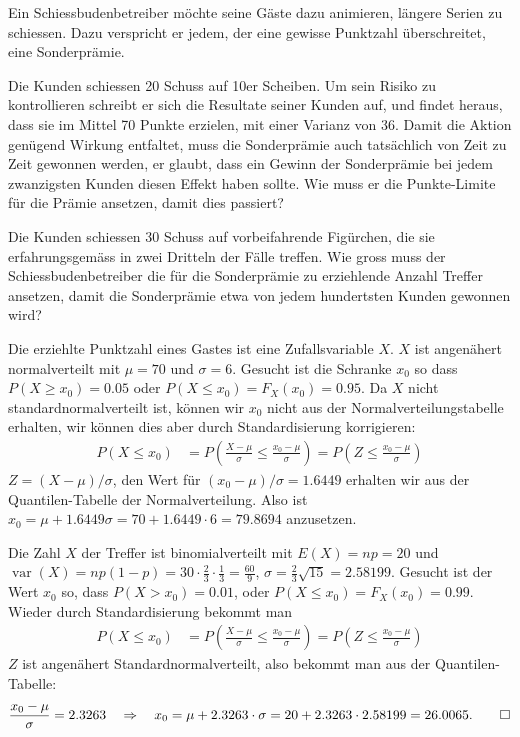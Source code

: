 Ein Schiessbudenbetreiber möchte seine Gäste dazu animieren,
längere Serien zu schiessen. Dazu verspricht er jedem, der eine
gewisse Punktzahl überschreitet, eine Sonderprämie.
\begin{teilaufgaben}
\item
Die Kunden schiessen 20 Schuss auf 10er Scheiben. Um sein Risiko
zu kontrollieren schreibt er sich die Resultate seiner Kunden auf,
und findet heraus, dass sie im Mittel 70 Punkte erzielen, mit einer
Varianz von 36. Damit die Aktion genügend Wirkung entfaltet,
muss die Sonderprämie auch tatsächlich von Zeit zu Zeit
gewonnen werden, er glaubt, dass ein Gewinn der Sonderprämie
bei jedem zwanzigsten Kunden diesen Effekt haben sollte. Wie
muss er die Punkte-Limite für die Prämie ansetzen, damit dies
passiert?
\item
Die Kunden schiessen 30 Schuss auf vorbeifahrende Figürchen, die
sie erfahrungsgemäss in zwei Dritteln der Fälle treffen. Wie
gross muss der Schiessbudenbetreiber die für die Sonderprämie
zu erziehlende Anzahl Treffer ansetzen, damit die Sonderprämie
etwa von jedem hundertsten Kunden gewonnen wird?
\end{teilaufgaben}


\begin{loesung}
\begin{teilaufgaben}
\item
Die erziehlte Punktzahl eines Gastes ist eine Zufallsvariable $X$.
$X$ ist angenähert normalverteilt mit $\mu=70$ und
$\sigma=6$. Gesucht ist die Schranke $x_0$ so dass
$P(X\ge x_0)=0.05$ oder $P(X\le x_0)=F_X(x_0)=0.95$.
Da $X$ nicht standardnormalverteilt ist, können wir $x_0$ nicht
aus der Normalverteilungstabelle erhalten, wir können dies aber
durch Standardisierung korrigieren:
\begin{align*}
P(X\le x_0)
&=
P\left(\frac{X-\mu}{\sigma}\le\frac{x_0-\mu}{\sigma}\right)
=
P\left(Z\le \frac{x_0-\mu}{\sigma}\right)
\end{align*}
$Z=(X-\mu)/\sigma$, den Wert für $(x_0-\mu)/\sigma=1.6449$ erhalten
wir aus der Quantilen-Tabelle der Normalverteilung. Also ist
$x_0=\mu +1.6449\sigma=70 + 1.6449\cdot 6=79.8694$ anzusetzen.
\item
Die Zahl $X$ der Treffer ist binomialverteilt mit $E(X) = np=20$ und
$\operatorname{var}(X)=np(1-p)=30\cdot\frac23\cdot\frac13=\frac{60}{9}$,
$\sigma = \frac23\sqrt{15}=2.58199$.
Gesucht ist der Wert $x_0$ so, dass $P(X>x_0)=0.01$, oder
$P(X\le x_0)=F_X(x_0)=0.99$. Wieder durch Standardisierung bekommt
man
\begin{align*}
P(X\le x_0)
&=
P\left(
\frac{X-\mu}{\sigma}\le\frac{x_0-\mu}{\sigma}
\right)
=
P\left(
Z\le \frac{x_0-\mu}{\sigma}
\right)
\end{align*}
$Z$ ist angenähert Standardnormalverteilt, also bekommt man aus
der Quantilen-Tabelle:
\[
\frac{x_0-\mu}{\sigma}=2.3263
\quad
\Rightarrow
\quad
x_0=\mu+2.3263\cdot \sigma=20 + 2.3263\cdot 2.58199 = 26.0065.
\qedhere
\]
\end{teilaufgaben}
\end{loesung}

